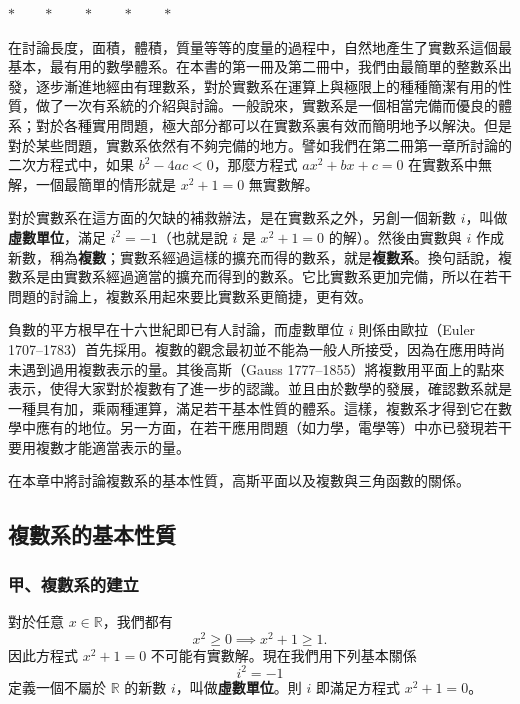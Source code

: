 \begin{center}
$* \qquad * \qquad * \qquad * \qquad *$
\end{center}

在討論長度，面積，體積，質量等等的度量的過程中，自然地產生了實數系這個最基本，最有用的數學體系。在本書的第一冊及第二冊中，我們由最簡單的整數系出發，逐步漸進地經由有理數系，對於實數系在運算上與極限上的種種簡潔有用的性質，做了一次有系統的介紹與討論。一般說來，實數系是一個相當完備而優良的體系；對於各種實用問題，極大部分都可以在實數系裏有效而簡明地予以解決。但是對於某些問題，實數系依然有不夠完備的地方。譬如我們在第二冊第一章所討論的二次方程式中，如果 $b^2-4ac < 0$，那麼方程式 $ax^2+bx+c=0$ 在實數系中無解，一個最簡單的情形就是 $x^2+1=0$ 無實數解。

對於實數系在這方面的欠缺的補救辦法，是在實數系之外，另創一個新數 $i$，叫做\textbf{虛數單位}，滿足 $i^2=-1$（也就是說 $i$ 是 $x^2+1=0$ 的解）。然後由實數與 $i$ 作成新數，稱為\textbf{複數}；實數系經過這樣的擴充而得的數系，就是\textbf{複數系}。換句話說，複數系是由實數系經過適當的擴充而得到的數系。它比實數系更加完備，所以在若干問題的討論上，複數系用起來要比實數系更簡捷，更有效。

負數的平方根早在十六世紀即已有人討論，而虛數單位 $i$ 則係由歐拉（Euler 1707--1783）首先採用。複數的觀念最初並不能為一般人所接受，因為在應用時尚未遇到過用複數表示的量。其後高斯（Gauss 1777--1855）將複數用平面上的點來表示，使得大家對於複數有了進一步的認識。並且由於數學的發展，確認數系就是一種具有加，乘兩種運算，滿足若干基本性質的體系。這樣，複數系才得到它在數學中應有的地位。另一方面，在若干應用問題（如力學，電學等）中亦已發現若干要用複數才能適當表示的量。

在本章中將討論複數系的基本性質，高斯平面以及複數與三角函數的關係。


\subsection{複數系的基本性質}\label{sec:b4-5-1}

\subsubsection*{甲、複數系的建立}

對於任意 $x \in \mathbb{R}$，我們都有
\[
x^2 \ge 0 \implies x^2+1 \ge 1.
\]
因此方程式 $x^2+1=0$ 不可能有實數解。現在我們用下列基本關係
\[
i^2 = -1
\]
定義一個不屬於 $\mathbb{R}$ 的新數 $i$，叫做\textbf{虛數單位}。則 $i$ 即滿足方程式 $x^2+1=0$。

